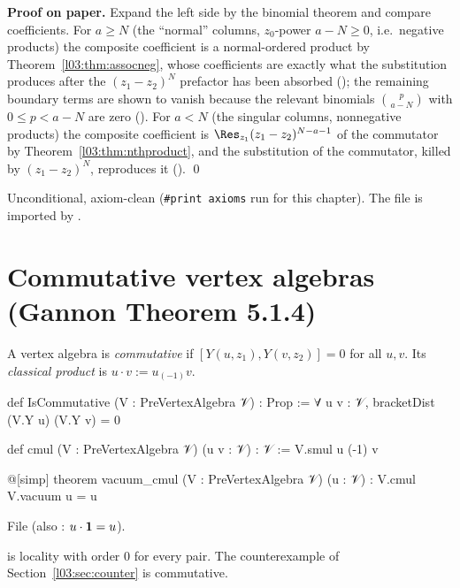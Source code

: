\textbf{Proof on paper.} Expand the left side by the binomial theorem and compare
coefficients. For $a\ge N$ (the ``normal'' columns, $z_0$-power $a-N\ge0$, i.e.\ negative products)
the composite coefficient is a normal-ordered product by Theorem~\ref{l03:thm:assocneg}, whose
coefficients are exactly what the substitution produces after the $(z_1-z_2)^N$ prefactor has been
absorbed (); the remaining boundary terms are shown to vanish because the relevant
binomials $\binom{p}{a-N}$ with $0\le p<a-N$ are zero (). For $a<N$ (the
singular columns, nonnegative products) the composite coefficient is $\Res_{z_1}(z_1-z_2)^{N-a-1}$ of the
commutator by Theorem~\ref{l03:thm:nthproduct}, and the substitution of the commutator, killed by
$(z_1-z_2)^N$, reproduces it (). \qed

\begin{status}
Unconditional, axiom-clean (\texttt{\#print axioms}  run for this
chapter). The file is imported by .
\end{status}

\section{Commutative vertex algebras (Gannon Theorem 5.1.4)}\label{l03:sec:comm}

\begin{definition}\label{l03:def:comm}
A vertex algebra is \emph{commutative} if $[Y(u,z_1),Y(v,z_2)] = 0$ for all $u,v$. Its
\emph{classical product} is $u\cdot v := u_{(-1)}v$.
\end{definition}
\begin{leancode}
def IsCommutative (V : PreVertexAlgebra 𝒱) : Prop :=
  ∀ u v : 𝒱, bracketDist (V.Y u) (V.Y v) = 0

def cmul (V : PreVertexAlgebra 𝒱) (u v : 𝒱) : 𝒱 := V.smul u (-1) v

@[simp] theorem vacuum_cmul (V : PreVertexAlgebra 𝒱) (u : 𝒱) : V.cmul V.vacuum u = u
\end{leancode}
File  (also :
$u\cdot\mathbf{1} = u$).

\begin{dictionary}
 is locality with order $0$ for every pair. The counterexample of
Section~\ref{l03:sec:counter} is commutative.
\end{dictionary}


